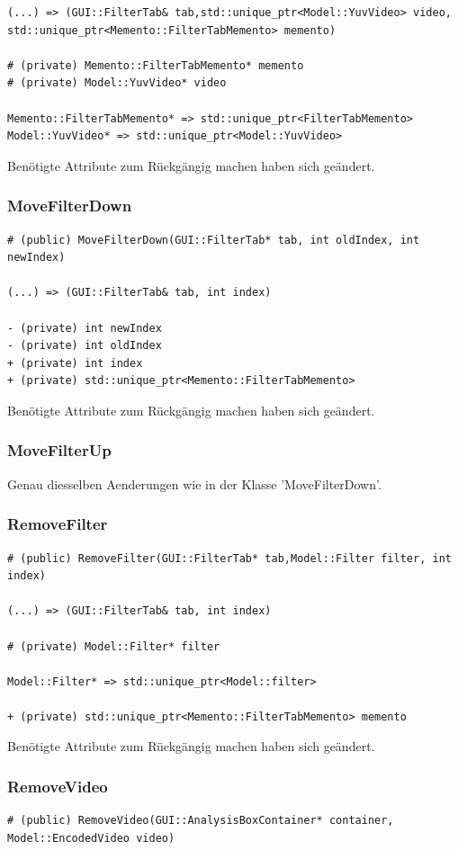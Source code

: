 \documentclass{scrartcl}
\begin{document}
{\begin{verbatim}
(...) => (GUI::FilterTab& tab,std::unique_ptr<Model::YuvVideo> video,
std::unique_ptr<Memento::FilterTabMemento> memento)

# (private) Memento::FilterTabMemento* memento
# (private) Model::YuvVideo* video

Memento::FilterTabMemento* => std::unique_ptr<FilterTabMemento>
Model::YuvVideo* => std::unique_ptr<Model::YuvVideo>
\end{verbatim}
Benötigte Attribute zum Rückgängig machen haben sich geändert.
\newpage
\subsubsection{MoveFilterDown}
\begin{verbatim}
# (public) MoveFilterDown(GUI::FilterTab* tab, int oldIndex, int newIndex)

(...) => (GUI::FilterTab& tab, int index)

- (private) int newIndex
- (private) int oldIndex
+ (private) int index
+ (private) std::unique_ptr<Memento::FilterTabMemento>
\end{verbatim}
Benötigte Attribute zum Rückgängig machen haben sich geändert.
\bigskip
\subsubsection{MoveFilterUp}
Genau diesselben Aenderungen wie in der Klasse 'MoveFilterDown'.
\subsubsection{RemoveFilter}
\begin{verbatim}
# (public) RemoveFilter(GUI::FilterTab* tab,Model::Filter filter, int index)

(...) => (GUI::FilterTab& tab, int index)

# (private) Model::Filter* filter

Model::Filter* => std::unique_ptr<Model::filter>

+ (private) std::unique_ptr<Memento::FilterTabMemento> memento
\end{verbatim}
Benötigte Attribute zum Rückgängig machen haben sich geändert.
\bigskip
\subsubsection{RemoveVideo}
\begin{verbatim}
# (public) RemoveVideo(GUI::AnalysisBoxContainer* container, Model::EncodedVideo video)


\end{verbatim}}
\end{document}
